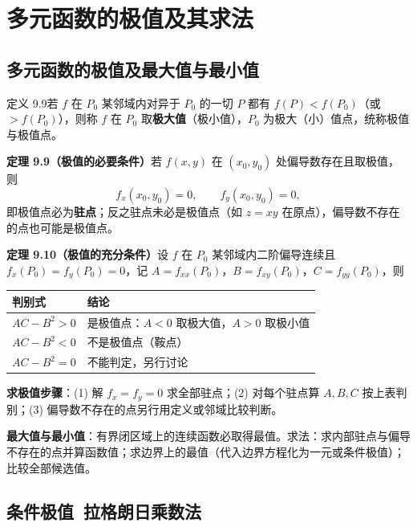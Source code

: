 
\section{多元函数的极值及其求法}

\subsection{多元函数的极值及最大值与最小值}

定义 9.9\quad 若 $f$ 在 $P_0$ 某邻域内对异于 $P_0$ 的一切 $P$ 都有 $f(P)<f(P_0)$（或 $>f(P_0)$），则称 $f$ 在 $P_0$ 取\textbf{极大值}（极小值），$P_0$ 为极大（小）值点，统称极值与极值点。

\textbf{定理 9.9（极值的必要条件）}\quad 若 $f(x,y)$ 在 $(x_0,y_0)$ 处偏导数存在且取极值，则
\begin{equation}
f_x(x_0,y_0)=0,\qquad f_y(x_0,y_0)=0 ,
\end{equation}
即极值点必为\textbf{驻点}；反之驻点未必是极值点（如 $z=xy$ 在原点），偏导数不存在的点也可能是极值点。

\textbf{定理 9.10（极值的充分条件）}\quad 设 $f$ 在 $P_0$ 某邻域内二阶偏导连续且 $f_x(P_0)=f_y(P_0)=0$，记 $A=f_{xx}(P_0)$，$B=f_{xy}(P_0)$，$C=f_{yy}(P_0)$，则
\begin{center}
\begin{tabular}{ll}
\toprule
判别式 & 结论 \\
\midrule
$AC-B^{2}>0$ & 是极值点：$A<0$ 取极大值，$A>0$ 取极小值 \\
$AC-B^{2}<0$ & 不是极值点（鞍点）\\
$AC-B^{2}=0$ & 不能判定，另行讨论 \\
\bottomrule
\end{tabular}
\end{center}

\textbf{求极值步骤}：(1) 解 $f_x=f_y=0$ 求全部驻点；(2) 对每个驻点算 $A,B,C$ 按上表判别；(3) 偏导数不存在的点另行用定义或邻域比较判断。

\textbf{最大值与最小值}：有界闭区域上的连续函数必取得最值。求法：求内部驻点与偏导不存在的点并算函数值；求边界上的最值（代入边界方程化为一元或条件极值）；比较全部候选值。


\subsection{条件极值\ 拉格朗日乘数法}

